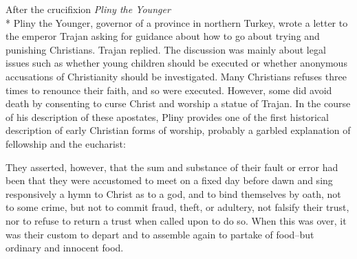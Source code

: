\documentclass[10pt,twoside]{article} %
\newcommand{\quotesize}{\normalsize{}}
\newcommand{\comm}[1]{\begingroup \color{black!50} #1\endgroup}
\newenvironment{quotetext}{\begingroup\quotesize}{\endgroup}
\newcommand{\subhead}[1]{\emph{#1}\\*}
\begin{document}
\begin{section}{After the crucifixion}
\subhead{Pliny the Younger}
%
%
\comm{Pliny the Younger, governor of a province in northern Turkey, wrote a letter to the emperor Trajan
asking for guidance about how to go about trying and punishing Christians. Trajan replied. The discussion was
mainly about legal issues such as whether young children should be executed or whether anonymous accusations
of Christianity should be investigated. Many Christians refuses three times to renounce their faith, and so were
executed. However, some did avoid death by consenting to curse Christ and worship a statue of Trajan. In the course
of his description of these apostates, Pliny provides one of the first historical description of early Christian
forms of worship, probably a garbled explanation of fellowship and the eucharist:}

\begin{quotetext}
They asserted, however, that the sum and substance of their fault or error had been that they were accustomed to meet on a fixed day before dawn and sing responsively a hymn to Christ as to a god, and to bind themselves by oath, not to some crime, but not to commit fraud, theft, or adultery, not falsify their trust, nor to refuse to return a trust when called upon to do so. When this was over, it was their custom to depart and to assemble again to partake of food--but ordinary and innocent food.
\end{quotetext}

\end{section}

\vfill\pagebreak

\end{document}
